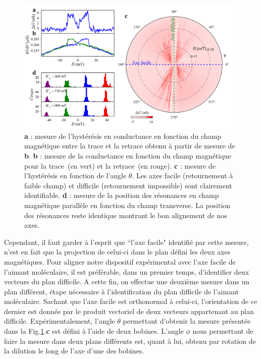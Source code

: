\begin{figure}
\includegraphics[scale=0.45]{Resultats/Alignement/Alignement.pdf} 
\caption{\textbf{a} : mesure de l’hystérésis en conductance en fonction du champ magnétique entre la trace et la retrace obtenu à partir de mesure de \textbf{b}. \textbf{b} : mesure de la conductance en fonction du champ magnétique pour la trace~(en vert) et la retrace~(en rouge). \textbf{c} : mesure de l'hystérésis en fonction de l'angle $\theta$. Les axes facile (retournement à faible champ) et difficile (retournement impossible) sont clairement identifiable. \textbf{d} : mesure de la position des résonances en champ magnétique parallèle en fonction du champ transverse. La position des résonances reste identique montrant le bon alignement de nos axes.}
\label{alignement}
\end{figure}

Cependant, il faut garder à l'esprit que ``l'axe facile" identifié par cette mesure, n'est en fait que la projection de celui-ci dans le plan défini les deux axes magnétiques. Pour aligner notre dispositif expérimental avec l'axe facile de l'aimant moléculaire, il est préférable, dans un premier temps, d'identifier deux vecteurs du plan difficile. A cette fin, on effectue une deuxième mesure dans un plan différent, étape nécessaire à l'identification du plan difficile de l'aimant moléculaire. Sachant que l'axe facile est orthonormal à celui-ci, l'orientation de ce dernier est donnée par le produit vectoriel de deux vecteurs appartenant au plan difficile. Expérimentalement, l'angle $\theta$ permettant d'obtenir la mesure présentée dans la Fig.\ref{alignement}.\textbf{c} est défini à l'aide de deux bobines. L'angle $\phi$ nous permettant de faire la mesure dans deux plans différents est, quant à lui, obtenu par rotation de la dilution le long de l'axe d'une des bobines.


